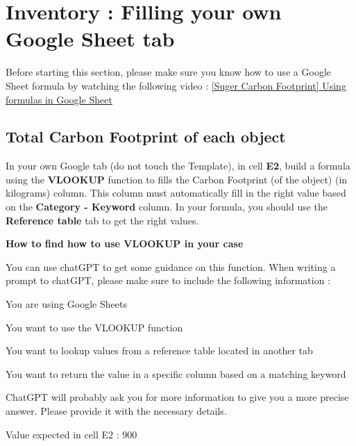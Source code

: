 \documentclass{exam}
\begin{document}
\section{Inventory : Filling your own Google Sheet tab}

Before starting this section, please make sure you know how to use a Google Sheet formula by watching the following video : \href{https://www.loom.com/share/36719b97cfb243b8a52dcccf79004bbb}{[Suger Carbon Footprint] Using formulas in Google Sheet}

\subsection*{Total Carbon Footprint of each object}

\begin{questions}
  \question In your own Google tab (do not touch the Template), in cell \textbf{E2}, build a formula using the \textbf{VLOOKUP} function to fills the Carbon Footprint (of the object) (in kilograms) column. This column must automatically fill in the right value based on the \textbf{Category - Keyword} column. In your formula, you should use the \textbf{Reference table} tab to get the right values.

  \begin{Indication}
  \textbf{How to find how to use VLOOKUP in your case}
  \begin{compactitem}
    \item You can use chatGPT to get some guidance on this function. When writing a prompt to chatGPT, please make sure to include the following information :
    \begin{compactitem}
        \item You are using Google Sheets
        \item You want to use the VLOOKUP function
        \item You want to lookup values from a reference table located in another tab
        \item You want to return the value in a specific column based on a matching keyword
        \item ChatGPT will probably ask you for more information to give you a more precise answer. Please provide it with the necessary details.
    \end{compactitem}
    \item Value expected in cell E2 : 900
  \end{compactitem}
\end{Indication}


\end{questions}
\end{document}
